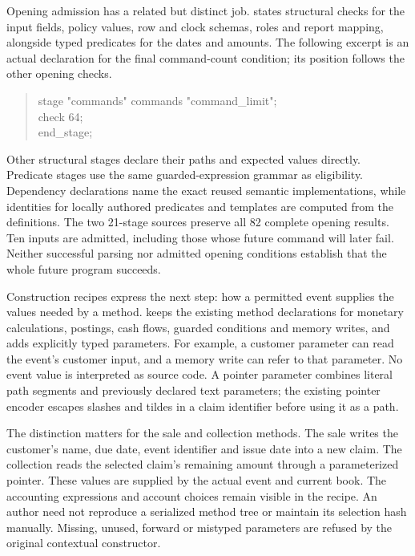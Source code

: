 Opening admission has a related but distinct job. 
states structural checks for the input fields, policy values, row and clock
schemas, roles and report mapping, alongside typed predicates for the dates
and amounts. The following excerpt is an actual declaration for the final
command-count condition; its position follows the other opening checks.

\begin{quote}\small\ttfamily
stage "commands" commands "command\_limit";\\
check 64;\\
end\_stage;
\end{quote}

Other structural stages declare their paths and expected values directly.
Predicate stages use the same guarded-expression grammar as eligibility.
Dependency declarations name the exact reused semantic implementations, while
identities for locally authored predicates and templates are computed from the
definitions. The two 21-stage sources preserve all 82 complete opening results.
Ten inputs are admitted, including those whose future command will later fail.
Neither successful parsing nor admitted opening conditions establish that the
whole future program succeeds.

Construction recipes express the next step: how a permitted event supplies the
values needed by a method.  keeps the existing
method declarations for monetary calculations, postings, cash flows, guarded
conditions and memory writes, and adds explicitly typed parameters. For
example, a customer parameter can read the event's customer input, and a
memory write can refer to that parameter. No event value is interpreted as
source code. A pointer parameter combines literal path segments and previously
declared text parameters; the existing pointer encoder escapes slashes and
tildes in a claim identifier before using it as a path.

The distinction matters for the sale and collection methods. The sale writes
the customer's name, due date, event identifier and issue date into a new
claim. The collection reads the selected claim's remaining amount through a
parameterized pointer. These values are supplied by the actual event and
current book. The accounting expressions and account choices remain visible
in the recipe. An author need not reproduce a serialized method tree or
maintain its selection hash manually. Missing, unused, forward or mistyped
parameters are refused by the original contextual constructor.

